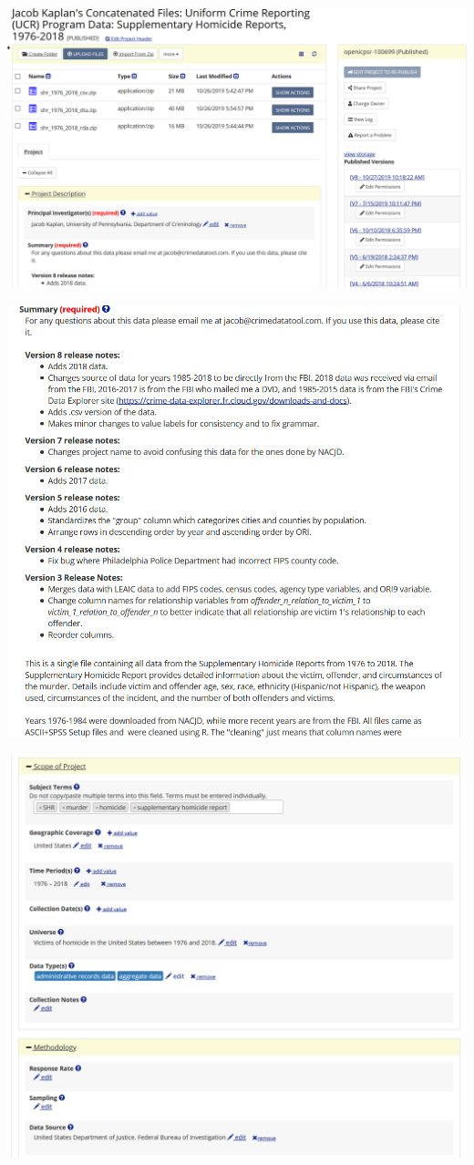 \documentclass[
  12pt,
]{book}
\begin{document}
\includegraphics{images/openICPSR1.PNG}

\includegraphics{images/openICPSR2.PNG}

\includegraphics{images/openICPSR3.PNG}
\end{document}
